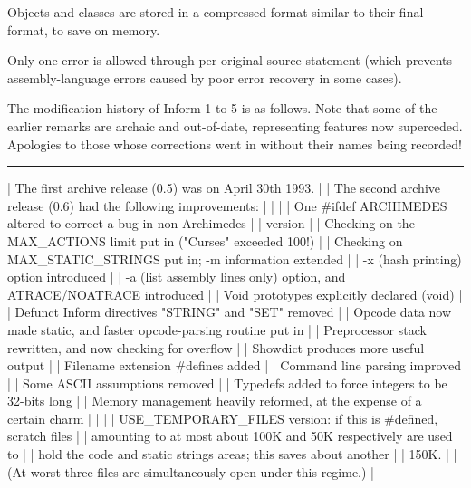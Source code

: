 Objects and classes are stored in a compressed format similar to their
final format, to save on memory.

Only one error is allowed through per original source statement (which
prevents assembly-language errors caused by poor error recovery in
some cases).

The modification history of Inform 1 to 5 is as follows.  Note that some of
the earlier remarks are archaic and out-of-date, representing features now
superceded.  Apologies to those whose corrections went in without their
names being recorded!
\smallskip
\hrule
\medskip
{}
\beginlines
|     The first archive release (0.5) was on April 30th 1993.               |
\endlines
\medskip
{}
\beginlines
|     The second archive release (0.6) had the following improvements:      |
|                                                                           |
|     One #ifdef ARCHIMEDES altered to correct a bug in non-Archimedes      |
|     version                                                               |
|     Checking on the MAX_ACTIONS limit put in ("Curses" exceeded 100!)     |
|     Checking on MAX_STATIC_STRINGS put in; -m information extended        |
|     -x (hash printing) option introduced                                  |
|     -a (list assembly lines only) option, and ATRACE/NOATRACE introduced  |
|     Void prototypes explicitly declared (void)                            |
|     Defunct Inform directives "STRING" and "SET" removed                  |
|     Opcode data now made static, and faster opcode-parsing routine put in |
|     Preprocessor stack rewritten, and now checking for overflow           |
|     Showdict produces more useful output                                  |
|     Filename extension #defines added                                     |
|     Command line parsing improved                                         |
|     Some ASCII assumptions removed                                        |
|     Typedefs added to force integers to be 32-bits long                   |
|     Memory management heavily reformed, at the expense of a certain charm |
|                                                                           |
|     USE_TEMPORARY_FILES version: if this is #defined, scratch files       |
|       amounting to at most about 100K and 50K respectively are used to    |
|       hold the code and static strings areas; this saves about another    |
|       150K.                                                               |
|       (At worst three files are simultaneously open under this regime.)   |
